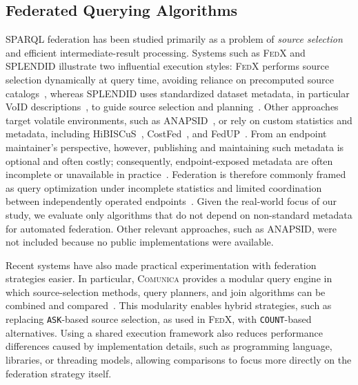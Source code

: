 \documentclass[runningheads]{llncs}
\begin{document}
\subsection{Federated Querying Algorithms}\label{sec3.1}
SPARQL federation has been studied primarily as a problem of \textit{source selection} and efficient intermediate-result processing. 
Systems such as \textsc{FedX} and \textsc{SPLENDID} illustrate two influential execution styles: \textsc{FedX} performs source selection dynamically at query time, avoiding reliance on precomputed source catalogs~\cite{schwarte2011fedx}, whereas \textsc{SPLENDID} uses standardized dataset metadata, in particular VoID descriptions~\cite{w3cvoid}, to guide source selection and planning~\cite{splendid2011}.
Other approaches target volatile environments, such as \textsc{ANAPSID}~\cite{anapsid2011}, or rely on custom statistics and metadata, including HiBISCuS~\cite{Saleem2014HiBISCuS}, CostFed~\cite{Saleem2018CostFed}, and FedUP~\cite{davat2024fedup}. 
From an endpoint maintainer’s perspective, however, publishing and maintaining such metadata is optional and often costly; consequently, endpoint-exposed metadata are often incomplete or unavailable in practice~\cite{Vandenbussche2017SPARQLES}. 
Federation is therefore commonly framed as query optimization under incomplete statistics and limited coordination between independently operated endpoints~\cite{montoya2017federation}. 
Given the real-world focus of our study, we evaluate only algorithms that do not depend on non-standard metadata for automated federation. Other relevant approaches, such as \textsc{ANAPSID}, were not included because no public implementations were available.

Recent systems have also made practical experimentation with federation strategies easier. 
In particular, \textsc{Comunica} provides a modular query engine in which source-selection methods, query planners, and join algorithms can be combined and compared~\cite{taelman2018comunica}. 
This modularity enables hybrid strategies, such as replacing \texttt{ASK}-based source selection, as used in \textsc{FedX}, with \texttt{COUNT}-based alternatives. 
Using a shared execution framework also reduces performance differences caused by implementation details, such as programming language, libraries, or threading models, allowing comparisons to focus more directly on the federation strategy itself.
\end{document}
